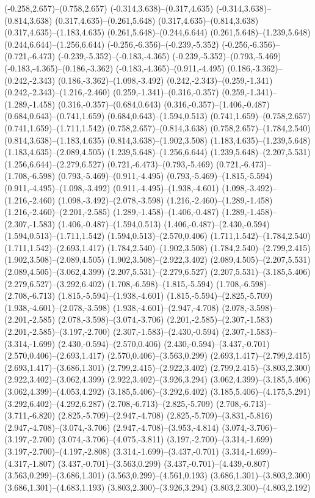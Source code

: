 \begin{scope}
(-0.258,2.657)--(0.758,2.657) (-0.314,3.638)--(0.317,4.635) (-0.314,3.638)--(0.814,3.638) (0.317,4.635)--(0.261,5.648) (0.317,4.635)--(0.814,3.638) (0.317,4.635)--(1.183,4.635) (0.261,5.648)--(0.244,6.644) (0.261,5.648)--(1.239,5.648) (0.244,6.644)--(1.256,6.644) (-0.256,-6.356)--(-0.239,-5.352) (-0.256,-6.356)--(0.721,-6.473) (-0.239,-5.352)--(-0.183,-4.365) (-0.239,-5.352)--(0.793,-5.469) (-0.183,-4.365)--(0.186,-3.362) (-0.183,-4.365)--(0.911,-4.495) (0.186,-3.362)--(0.242,-2.343) (0.186,-3.362)--(1.098,-3.492) (0.242,-2.343)--(0.259,-1.341) (0.242,-2.343)--(1.216,-2.460) (0.259,-1.341)--(0.316,-0.357) (0.259,-1.341)--(1.289,-1.458) (0.316,-0.357)--(0.684,0.643) (0.316,-0.357)--(1.406,-0.487) (0.684,0.643)--(0.741,1.659) (0.684,0.643)--(1.594,0.513) (0.741,1.659)--(0.758,2.657) (0.741,1.659)--(1.711,1.542) (0.758,2.657)--(0.814,3.638) (0.758,2.657)--(1.784,2.540) (0.814,3.638)--(1.183,4.635) (0.814,3.638)--(1.902,3.508) (1.183,4.635)--(1.239,5.648) (1.183,4.635)--(2.089,4.505) (1.239,5.648)--(1.256,6.644) (1.239,5.648)--(2.207,5.531) (1.256,6.644)--(2.279,6.527) (0.721,-6.473)--(0.793,-5.469) (0.721,-6.473)--(1.708,-6.598) (0.793,-5.469)--(0.911,-4.495) (0.793,-5.469)--(1.815,-5.594) (0.911,-4.495)--(1.098,-3.492) (0.911,-4.495)--(1.938,-4.601) (1.098,-3.492)--(1.216,-2.460) (1.098,-3.492)--(2.078,-3.598) (1.216,-2.460)--(1.289,-1.458) (1.216,-2.460)--(2.201,-2.585) (1.289,-1.458)--(1.406,-0.487) (1.289,-1.458)--(2.307,-1.583) (1.406,-0.487)--(1.594,0.513) (1.406,-0.487)--(2.430,-0.594) (1.594,0.513)--(1.711,1.542) (1.594,0.513)--(2.570,0.406) (1.711,1.542)--(1.784,2.540) (1.711,1.542)--(2.693,1.417) (1.784,2.540)--(1.902,3.508) (1.784,2.540)--(2.799,2.415) (1.902,3.508)--(2.089,4.505) (1.902,3.508)--(2.922,3.402) (2.089,4.505)--(2.207,5.531) (2.089,4.505)--(3.062,4.399) (2.207,5.531)--(2.279,6.527) (2.207,5.531)--(3.185,5.406) (2.279,6.527)--(3.292,6.402) (1.708,-6.598)--(1.815,-5.594) (1.708,-6.598)--(2.708,-6.713) (1.815,-5.594)--(1.938,-4.601) (1.815,-5.594)--(2.825,-5.709) (1.938,-4.601)--(2.078,-3.598) (1.938,-4.601)--(2.947,-4.708) (2.078,-3.598)--(2.201,-2.585) (2.078,-3.598)--(3.074,-3.706) (2.201,-2.585)--(2.307,-1.583) (2.201,-2.585)--(3.197,-2.700) (2.307,-1.583)--(2.430,-0.594) (2.307,-1.583)--(3.314,-1.699) (2.430,-0.594)--(2.570,0.406) (2.430,-0.594)--(3.437,-0.701) (2.570,0.406)--(2.693,1.417) (2.570,0.406)--(3.563,0.299) (2.693,1.417)--(2.799,2.415) (2.693,1.417)--(3.686,1.301) (2.799,2.415)--(2.922,3.402) (2.799,2.415)--(3.803,2.300) (2.922,3.402)--(3.062,4.399) (2.922,3.402)--(3.926,3.294) (3.062,4.399)--(3.185,5.406) (3.062,4.399)--(4.053,4.292) (3.185,5.406)--(3.292,6.402) (3.185,5.406)--(4.175,5.291) (3.292,6.402)--(4.292,6.287) (2.708,-6.713)--(2.825,-5.709) (2.708,-6.713)--(3.711,-6.820) (2.825,-5.709)--(2.947,-4.708) (2.825,-5.709)--(3.831,-5.816) (2.947,-4.708)--(3.074,-3.706) (2.947,-4.708)--(3.953,-4.814) (3.074,-3.706)--(3.197,-2.700) (3.074,-3.706)--(4.075,-3.811) (3.197,-2.700)--(3.314,-1.699) (3.197,-2.700)--(4.197,-2.808) (3.314,-1.699)--(3.437,-0.701) (3.314,-1.699)--(4.317,-1.807) (3.437,-0.701)--(3.563,0.299) (3.437,-0.701)--(4.439,-0.807) (3.563,0.299)--(3.686,1.301) (3.563,0.299)--(4.561,0.193) (3.686,1.301)--(3.803,2.300) (3.686,1.301)--(4.683,1.193) (3.803,2.300)--(3.926,3.294) (3.803,2.300)--(4.803,2.192) 
\end{scope}
